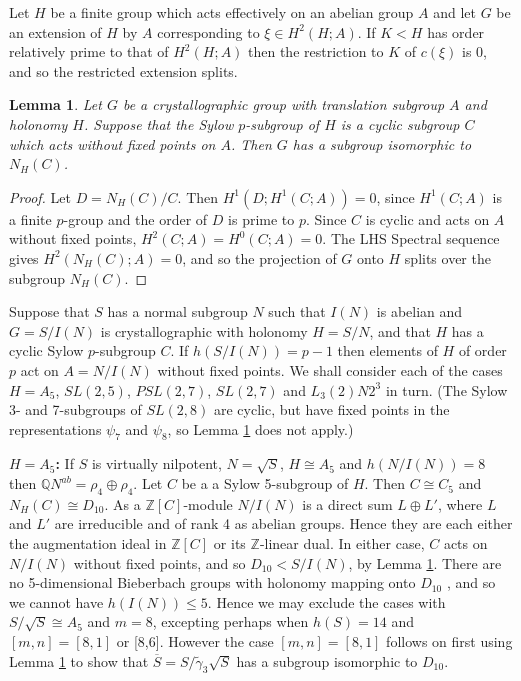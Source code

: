 \documentclass[12pt]{amsart}
\renewcommand{\leq}{\leqslant}
\newtheorem{lemma}[theorem]{Lemma}
\begin{document}
Let $H$ be a finite group which acts effectively on an abelian group $A$
and let $G$ be an extension of $H$ by $A$ corresponding to $\xi\in{H^2(H;A)}$.
If $K<H$ has order relatively prime to that of $H^2(H;A)$ 
then the restriction to $K$ of $c(\xi)$ is 0,
and so the restricted extension splits.

\begin{lemma}
\label{split normal}
Let $G$ be a crystallographic group with translation subgroup $A$ and holonomy $H$.
Suppose that the Sylow $p$-subgroup of $H$ is a cyclic subgroup $C$ which 
acts without fixed points on $A$.
Then $G$ has a subgroup isomorphic to $N_H(C)$.
\end{lemma}

\begin{proof}
Let $D=N_H(C)/C$.
Then $H^1(D;H^1(C;A))=0$,
since $H^1(C;A)$ is a finite $p$-group and the order of $D$ is prime to $p$.
Since $C$ is cyclic and acts on $A$ without fixed points,  $H^2(C;A)=H^0(C;A)=0$.
The LHS Spectral sequence gives $H^2(N_H(C);A)=0$,
and so the projection of $G$ onto $H$ splits over the subgroup $N_H(C)$.
\end{proof}

Suppose that $S$ has a normal subgroup $N$ such that $I(N)$ is abelian and
$G=S/I(N)$ is crystallographic with holonomy $H=S/N$,
and that $H$ has a cyclic Sylow $p$-subgroup $C$.
If $h(S/I(N))=p-1$ then elements of $H$ of order $p$ act on $A=N/I(N)$
without fixed points.
We shall consider each of the cases $H=A_5$,  
$SL(2,5)$, $PSL(2,7)$, 
$SL(2,7)$ and $L_3(2)N2^3$ in turn.
(The Sylow 3- and 7-subgroups of $SL(2,8)$ are cyclic, 
but have fixed points in the representations $\psi_7$ and $\psi_8$,
so Lemma \ref{split normal} does not apply.)

\medskip
\noindent$H=A_5${\bf :}
If $S$ is virtually nilpotent,  $N=\sqrt{S}$, 
$H\cong{A_5}$ and $h(N/I(N))=8$ then 
$\mathbb{Q}N^{ab}=\rho_4\oplus\rho_4$.
Let $C$ be a a Sylow 5-subgroup of $H$.
Then $C\cong{C_5}$  and $N_H(C)\cong{D_{10}}$.
As a $\mathbb{Z}[C]$-module $N/I(N)$ is a direct sum $L\oplus{L'}$, 
where $L$ and $L'$ are irreducible and of rank 4 as abelian groups.
Hence they are each either the augmentation ideal in $\mathbb{Z}[C]$
or its $\mathbb{Z}$-linear dual. 
In either case,  $C$ acts  on $N/I(N)$ without fixed points,
and so $D_{10}<S/I(N)$,
by Lemma \ref{split normal}.
There are no  5-dimensional Bieberbach groups with holonomy
mapping onto $D_{10}$ \cite{CS},
and so we cannot have $h(I(N))\leq5$.
Hence we may exclude the cases with $S/\sqrt{S}\cong{A_5}$ and $m=8$,
excepting perhaps when $h(S)=14$ and $[m,n]=[8,1]$ or [8,6].
However the case $[m,n]=[8,1]$ follows on first using Lemma \ref{split normal}
to show that $\overline{S}=S/\tilde\gamma_3\sqrt{S}$ 
has a subgroup isomorphic to $D_{10}$.
\end{document}

